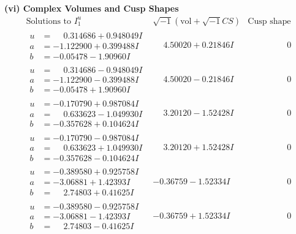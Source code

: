 \documentclass[1p]{elsarticle_modified}
\theoremstyle{definition}
\newcommand{\I}{\sqrt{-1}}
\begin{document}
\newpage\flushleft \textbf{(vi) Complex Volumes and Cusp Shapes}
$$\begin{array}{c|c|c}  
\text{Solutions to }I^u_{1}& \I (\text{vol} + \sqrt{-1}CS) & \text{Cusp shape}\\
 \hline 
\begin{aligned}
u &= \phantom{-}0.314686 + 0.948049 I \\
a &= -1.122900 + 0.399488 I \\
b &= -0.05478 - 1.90960 I\end{aligned}
 & \phantom{-}4.50020 + 0.21846 I & \phantom{-0.000000 } 0 \\ \hline\begin{aligned}
u &= \phantom{-}0.314686 - 0.948049 I \\
a &= -1.122900 - 0.399488 I \\
b &= -0.05478 + 1.90960 I\end{aligned}
 & \phantom{-}4.50020 - 0.21846 I & \phantom{-0.000000 } 0 \\ \hline\begin{aligned}
u &= -0.170790 + 0.987084 I \\
a &= \phantom{-}0.633623 - 1.049930 I \\
b &= -0.357628 + 0.104624 I\end{aligned}
 & \phantom{-}3.20120 - 1.52428 I & \phantom{-0.000000 } 0 \\ \hline\begin{aligned}
u &= -0.170790 - 0.987084 I \\
a &= \phantom{-}0.633623 + 1.049930 I \\
b &= -0.357628 - 0.104624 I\end{aligned}
 & \phantom{-}3.20120 + 1.52428 I & \phantom{-0.000000 } 0 \\ \hline\begin{aligned}
u &= -0.389580 + 0.925758 I \\
a &= -3.06881 + 1.42393 I \\
b &= \phantom{-}2.74803 + 0.41625 I\end{aligned}
 & -0.36759 - 1.52334 I & \phantom{-0.000000 } 0 \\ \hline\begin{aligned}
u &= -0.389580 - 0.925758 I \\
a &= -3.06881 - 1.42393 I \\
b &= \phantom{-}2.74803 - 0.41625 I\end{aligned}
 & -0.36759 + 1.52334 I & \phantom{-0.000000 } 0 \\ \hline\begin{aligned}

\end{aligned}
\end{array}$$
\end{document}
